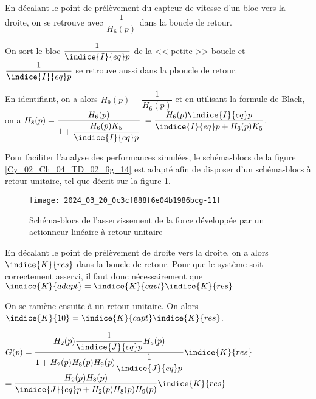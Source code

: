 \ifprof
\begin{corrige}
En décalant le point de prélèvement du capteur de vitesse d'un bloc vers la droite, on se retrouve avec $\dfrac{1}{H_6(p)}$ dans la boucle de retour. 

On sort le bloc $\dfrac{1}{\indice{I}{eq}p}$ de la << petite >> boucle et $\dfrac{1}{\indice{I}{eq}p}$ se retrouve aussi dans la pboucle de retour. 

En identifiant, on a alors $H_9(p)=\dfrac{1}{H_6(p)}$ et en utilisant la formule de Black, on a 
$H_8(p)=\dfrac{H_6(p)}{1+ \dfrac{H_6(p) K_5}{\indice{I}{eq}p} }$ $=\dfrac{H_6(p) \indice{I}{eq}p}{\indice{I}{eq}p+H_6(p) K_5 }$.


\end{corrige}
\else
\fi

\ifprof
\else
Pour faciliter l'analyse des performances simulées, le schéma-blocs de la figure \ref{Cy_02_Ch_04_TD_02_fig_14} est adapté afin de disposer d'un schéma-blocs 
à retour unitaire, tel que décrit sur la figure \ref{Cy_02_Ch_04_TD_02_fig_15}.


\begin{figure}[!h]
\texttt{[image: 2024\_03\_20\_0c3cf888f6e04b1986bcg-11]}
\caption{Schéma-blocs de l'asservissement de la force développée par un actionneur linéaire à retour unitaire \label{Cy_02_Ch_04_TD_02_fig_15}}
\end{figure}
\fi


\ifprof
\begin{corrige}
En décalant le point de prélèvement de droite vers la droite, on a alors $\indice{K}{res}$ dans la boucle de retour. 
Pour que le système soit correctement asservi, il faut donc nécessairement que 
$\indice{K}{adapt} = \indice{K}{capt}\indice{K}{res}$

On se ramène ensuite à un retour unitaire. On alors $\indice{K}{10} = \indice{K}{capt}\indice{K}{res}$.
\end{corrige}
\else
\fi

\ifprof
\begin{corrige}
$G(p)=\dfrac{H_2(p)\dfrac{1}{\indice{J}{eq}p}H_8(p)}{1+H_2(p)H_8(p)H_9(p)\dfrac{1}{\indice{J}{eq}p}}\indice{K}{res}$
$ = \dfrac{H_2(p)H_8(p)}{\indice{J}{eq}p+H_2(p)H_8(p)H_9(p)}\indice{K}{res}$
\end{corrige}
\else
\fi

